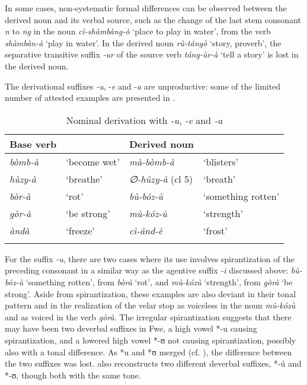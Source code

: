 In some cases, non-systematic formal differences can be observed between the derived noun and its verbal source, such as the change of the last stem consonant \textit{n} to \textit{ng} in the noun \textit{cì-shàmbàng-ò} ‘place to play in water’, from the verb \textit{shàmbàn-à} ‘play in water’. In the derived noun \textit{rù-tângò} ‘story, proverb’, the separative transitive suffix \textit{-ur} of the source verb \textit{táng-ùr-à} ‘tell a story’ is lost in the derived noun.

The derivational suffixes \textit{-u}, -\textit{e} and -\textit{a} are unproductive: some of the limited number of attested examples are presented in .

\begin{table}
\label{bkm:Ref75257806}\caption{\label{tab:4:14}Nominal derivation with \textit{-u}, \textit{-e} and \textit{-a}}

\begin{tabular}{llll}
\lsptoprule
Base verb &  & Derived noun & \\
\midrule
\textit{bòmb-à} & ‘become wet’ & \textit{mà-bòmb-à} & ‘blisters’\\
\textit{hùzy-à} & ‘breathe’ & \textit{∅-hûzy-à} (cl 5) & ‘breath’\\
\textit{bòr-à} & ‘rot’ & \textit{bù-bóz-ù} & ‘something rotten’\\
\textit{gòr-à} & ‘be strong’ & \textit{mù-kóz-ù} & ‘strength’\\
\textit{àndà} & ‘freeze’ & \textit{cì-ând-è} & ‘frost’\\
\lspbottomrule
\end{tabular}
\end{table}

For the suffix \textit{-u}, there are two cases where its use involves spirantization of the preceding consonant in a similar way as the agentive suffix \textit{-i} discussed above: \textit{bù-bóz-ù} ‘something rotten’, from \textit{bòrà} ‘rot’, and \textit{mù-kózù} ‘strength’, from \textit{gòrà} ‘be strong’. Aside from spirantization, these examples are also deviant in their tonal pattern and in the realization of the velar stop as voiceless in the noun \textit{mù-kózù} and as voiced in the verb \textit{gòrà}. The irregular spirantization suggests that there may have been two deverbal suffixes in Fwe, a high vowel *-u causing spirantization, and a lowered high vowel *-ʊ not causing spirantization, possibly also with a tonal difference. As *u and *ʊ merged (cf. \citealt{Bostoen2009}), the difference between the two suffixes was lost. {\citet[95]{Meeussen1967}} also reconstructs two different deverbal suffixes, *-ú and *-ʊ, though both with the same tone.

